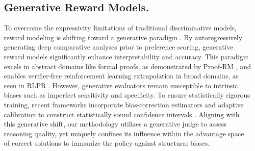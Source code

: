 \subsection{Generative Reward Models.}


To overcome the expressivity limitations of traditional discriminative models, reward modeling is shifting toward a generative paradigm \citep{Mahan2024}. By autoregressively generating deep comparative analyses prior to preference scoring, generative reward models significantly enhance interpretability and accuracy. This paradigm excels in abstract domains like formal proofs, as demonstrated by Proof-RM \citep{Yang2026}, and enables verifier-free reinforcement learning extrapolation in broad domains, as seen in RLPR \citep{Yu2025b}. However, generative evaluators remain susceptible to intrinsic biases such as imperfect sensitivity and specificity. To ensure statistically rigorous training, recent frameworks incorporate bias-correction estimators and adaptive calibration to construct statistically sound confidence intervals \citep{Lee2025}. Aligning with this generative shift, our methodology utilizes a generative judge to assess reasoning quality, yet uniquely confines its influence within the advantage space of correct solutions to immunize the policy against structural biases.



















